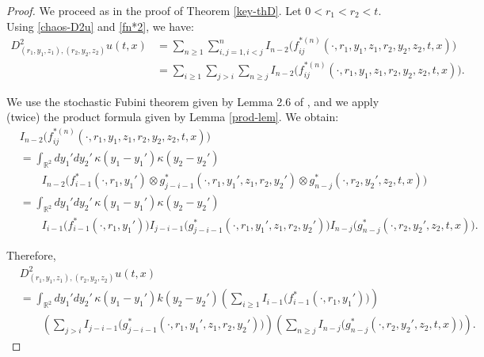 \documentclass[12pt]{article}
\def\bR{\mathbb{R}}
\def\k{\kappa}
\begin{document}
\begin{proof} We proceed as in the proof of Theorem \ref{key-thD}. Let $0<r_1 < r_2<t$. Using \eqref{chaos-D2u} and \eqref{fn*2}, we have:
\begin{align*}
D^2_{(r_1,y_1,z_1),(r_2,y_2,z_2)}u(t,x) & = \sum_{n\geq 1} \sum_{i,j=1, i<j}^{n}I_{n-2}\big(f_{ij}^{*(n)}(\cdot,r_1,y_1,z_1,r_2,y_2,z_2,t,x)\big)
\\
& = \sum_{i \geq 1} \sum_{j > i} \sum_{n\geq j}I_{n-2}\big(f_{ij}^{*(n)}(\cdot,r_1,y_1,z_1,r_2,y_2,z_2,t,x)\big).
\end{align*}

We use the stochastic Fubini theorem given by Lemma 2.6 of \cite{BZ24}, and we apply (twice) the product formula given by Lemma \ref{prod-lem}. We obtain:
\begin{align*}
& I_{n-2}\big(f_{ij}^{*(n)}(\cdot,r_1,y_1,z_1,r_2,y_2,z_2,t,x)\big) 
\\
& = \int_{\bR^2} dy_1' dy_2' \, \k(y_1-y_1') \k(y_2 - y_2') 
\\
& \qquad I_{n-2}\big(f_{i-1}^*(\cdot,r_1,y_1')\otimes g_{j-i-1}^*(\cdot,r_1,y_1',z_1,r_2,y_2') \otimes g_{n-j}^*(\cdot,r_2,y_2',z_2,t,x) \big) 
\\
& = \int_{\bR^2}dy_1'dy_2' \, \k(y_1-y_1') \k(y_2-y_2') 
\\
& \qquad I_{i-1}\big(f_{i-1}^*(\cdot,r_1,y_1')\big)  I_{j-i-1}\big( g_{j-i-1}^*(\cdot,r_1,y_1',z_1,r_2,y_2')\big)I_{n-j}\big( g_{n-j}^*(\cdot,r_2,y_2',z_2,t,x)\big). 
\end{align*}

Therefore,
\begin{align*}
& D^2_{(r_1,y_1,z_1),(r_2,y_2,z_2)}u(t,x) 
\\
&= \int_{\bR^2}  dy_1'dy_2' \, \k(y_1-y_1')k(y_2-y_2') \left(\sum_{i\geq 1} I_{i-1}\big(f_{i-1}^*(\cdot,r_1,y_1') \big) \right) 
\\
& \qquad  \left(\sum_{j > i} I_{j-i-1}\big( g_{j-i-1}^*(\cdot,r_1,y_1',z_1,r_2,y_2')\big) \right) \left(\sum_{n \geq j} I_{n-j}\big( g_{n-j}^*(\cdot,r_2,y_2',z_2,t,x)\big) \right).
\end{align*}


\end{proof}
\end{document}
